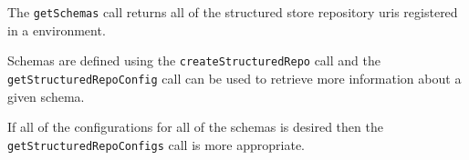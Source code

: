 The \verb+getSchemas+ call returns all of the structured store repository uris registered in a \Rapture environment.

Schemas are defined using the \verb+createStructuredRepo+ call and the \verb+getStructuredRepoConfig+ call can be used
to retrieve more information about a given schema.

If all of the configurations for all of the schemas is desired then the \verb+getStructuredRepoConfigs+ call is more appropriate.
